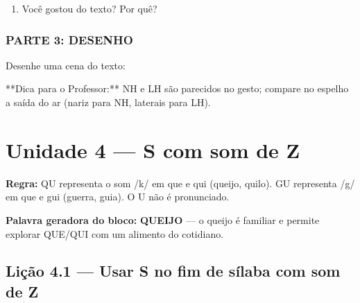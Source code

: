 \begin{exercicio}
\begin{enumerate}
  \item Você gostou do texto? Por quê?
  \begin{center}
  \underline{\hspace{12cm}}
  \end{center}

\end{enumerate}

\subsection*{PARTE 3: DESENHO}

Desenhe uma cena do texto:

\begin{center}
\end{center}

\end{exercicio}

\begin{dica}
**Dica para o Professor:** NH e LH são parecidos no gesto; compare no espelho a saída do ar (nariz para NH, laterais para LH).
\end{dica}



\chapter{Unidade 4 --- S com som de Z}


\textbf{Regra:} QU representa o som /k/ em que e qui (queijo, quilo). GU representa /g/ em que e gui (guerra, guia). O U não é pronunciado.

\textbf{Palavra geradora do bloco:} \textbf{QUEIJO} --- o queijo é familiar e permite explorar QUE/QUI com um alimento do cotidiano.

\section{Lição 4.1 --- Usar S no fim de sílaba com som de Z}

